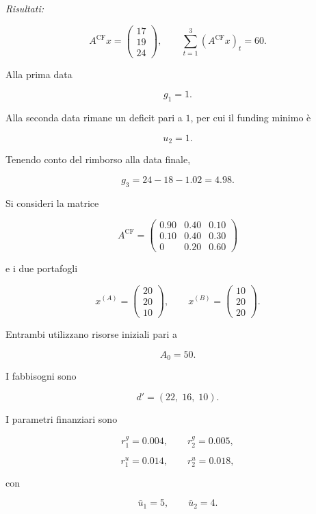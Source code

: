\noindent
\textit{Risultati:}

\[
A^{\mathrm{CF}}x
=
\begin{pmatrix}
17\\
19\\
24
\end{pmatrix},
\qquad
\sum_{t=1}^{3}(A^{\mathrm{CF}}x)_t=60.
\]

Alla prima data

\[
g_1=1.
\]

Alla seconda data rimane un deficit pari a $1$, per cui il funding minimo
\`e

\[
u_2=1.
\]

Tenendo conto del rimborso alla data finale,

\[
g_3=24-18-1.02=4.98.
\]


\begin{exercise}

\label{ex:cap12-proposto-confronto-portafogli}

Si consideri la matrice

\[
A^{\mathrm{CF}}
=
\begin{pmatrix}
0.90 & 0.40 & 0.10\\
0.10 & 0.40 & 0.30\\
0    & 0.20 & 0.60
\end{pmatrix}
\]

e i due portafogli

\[
x^{(A)}
=
\begin{pmatrix}
20\\
20\\
10
\end{pmatrix},
\qquad
x^{(B)}
=
\begin{pmatrix}
10\\
20\\
20
\end{pmatrix}.
\]

Entrambi utilizzano risorse iniziali pari a

\[
A_0=50.
\]

I fabbisogni sono

\[
d'
=
(22,\;16,\;10).
\]

I parametri finanziari sono

\[
r_1^{g}=0.004,
\qquad
r_2^{g}=0.005,
\]

\[
r_1^{u}=0.014,
\qquad
r_2^{u}=0.018,
\]

con

\[
\bar u_1=5,
\qquad
\bar u_2=4.
\]


\end{exercise}
